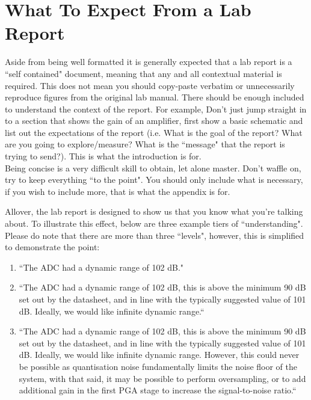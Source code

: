 \documentclass[conference,10pt]{IEEEtran}
\begin{document}
\section{What To Expect From a Lab Report}
    Aside from being well formatted it is generally expected that a lab report is a ``self contained" document, meaning that any and all contextual material is required. This does not mean you should copy-paste verbatim or unnecessarily reproduce figures from the original lab manual. There should be enough included to understand the context of the report. For example, Don't just jump straight in to a section that shows the gain of an amplifier, first show a basic schematic and list out the expectations of the report (i.e. What is the goal of the report? What are you going to explore/measure? What is the ``message" that the report is trying to send?). This is what the introduction is for. \\
    
    Being concise is a very difficult skill to obtain, let alone master. Don't waffle on, try to keep everything ``to the point". You should only include what is necessary, if you wish to include more, that is what the appendix is for. 
    
    Allover, the lab report is designed to show us that you know what you're talking about. To illustrate this effect, below are three example tiers of ``understanding". Please do note that there are more than three ``levels", however, this is simplified to demonstrate the point:
    
    \begin{enumerate}
        \item ``The ADC had a dynamic range of 102 dB."
        \item ``The ADC had a dynamic range of 102 dB, this is above the minimum 90 dB set out by the datasheet, and in line with the typically suggested value of 101 dB. Ideally, we would like infinite dynamic range.``
        \item ``The ADC had a dynamic range of 102 dB, this is above the minimum 90 dB set out by the datasheet, and in line with the typically suggested value of 101 dB. Ideally, we would like infinite dynamic range. However, this could never be possible as quantisation noise fundamentally limits the noise floor of the system, with that said, it may be possible to perform oversampling, or to add additional gain in the first PGA stage to increase the signal-to-noise ratio.``
    \end{enumerate}
    
\end{document}
